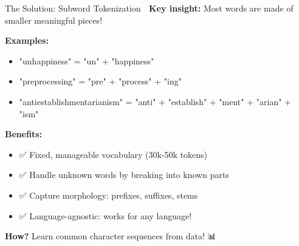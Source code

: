 \documentclass[aspectratio=169]{beamer}
\begin{document}
\begin{frame}[shrink=10]{The Solution: Subword Tokenization 🎯}
    \textbf{Key insight:} Most words are made of smaller meaningful pieces!

    \vspace{0.5em}
    \textbf{Examples:}
    \begin{itemize}\setlength{\itemsep}{0pt}
        \item "unhappiness" = "un" + "happiness"
        \item "preprocessing" = "pre" + "process" + "ing"
        \item "antiestablishmentarianism" = "anti" + "establish" + "ment" + "arian" + "ism"
    \end{itemize}

    \vspace{0.5em}
    \textbf{Benefits:}
    \begin{itemize}\setlength{\itemsep}{0pt}
        \item ✅ Fixed, manageable vocabulary (30k-50k tokens)
        \item ✅ Handle unknown words by breaking into known parts
        \item ✅ Capture morphology: prefixes, suffixes, stems
        \item ✅ Language-agnostic: works for any language!
    \end{itemize}

    \vspace{0.5em}
    \textbf{How?} Learn common character sequences from data! 📊
\end{frame}
\end{document}
